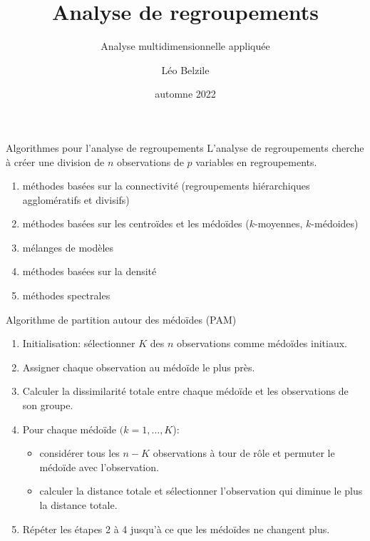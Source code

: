 \documentclass[
  ignorenonframetext,
]{beamer}
\title{Analyse de regroupements}
\subtitle{Analyse multidimensionnelle appliquée}
\author{Léo Belzile}
\date{automne 2022}
\institute{HEC Montréal}
\providecommand{\tightlist}{%
  \setlength{\itemsep}{0pt}\setlength{\parskip}{0pt}}\usepackage{longtable,booktabs,array}
\begin{document}
\frame{\titlepage}
\ifdefined\Shaded\renewenvironment{Shaded}{\begin{tcolorbox}[borderline west={3pt}{0pt}{shadecolor}, interior hidden, frame hidden, breakable, boxrule=0pt, enhanced, sharp corners]}{\end{tcolorbox}}\fi

\begin{frame}{Algorithmes pour l'analyse de regroupements}
\protect\hypertarget{algorithmes-pour-lanalyse-de-regroupements}{}
L'analyse de regroupements cherche à créer une division de \(n\)
observations de \(p\) variables en regroupements.

\begin{enumerate}
\tightlist
\item
  méthodes basées sur la connectivité (regroupements hiérarchiques
  agglomératifs et divisifs)
\item
  méthodes basées sur les centroïdes et les médoïdes (\(k\)-moyennes,
  \(k\)-médoides)
\item
  mélanges de modèles
\item
  méthodes basées sur la densité
\item
  méthodes spectrales
\end{enumerate}
\end{frame}

\begin{frame}{Algorithme de partition autour des médoïdes (PAM)}
\protect\hypertarget{algorithme-de-partition-autour-des-muxe9douxefdes-pam}{}
\begin{enumerate}
\tightlist
\item
  Initialisation: sélectionner \(K\) des \(n\) observations comme
  médoïdes initiaux.
\item
  Assigner chaque observation au médoïde le plus près.
\item
  Calculer la dissimilarité totale entre chaque médoïde et les
  observations de son groupe.
\item
  Pour chaque médoïde \((k=1, \ldots, K\)):

  \begin{itemize}
  \tightlist
  \item
    considérer tous les \(n-K\) observations à tour de rôle et permuter
    le médoïde avec l'observation.\\
  \item
    calculer la distance totale et sélectionner l'observation qui
    diminue le plus la distance totale.
  \end{itemize}
\item
  Répéter les étapes 2 à 4 jusqu'à ce que les médoïdes ne changent plus.
\end{enumerate}
\end{frame}
\end{document}
